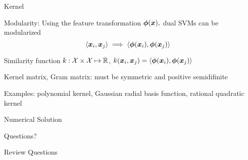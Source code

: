 \documentclass[handout,fleqn,aspectratio=169]{beamer}
\begin{document}
\begin{frame}{Kernel}

{
\bigskip

\plitemsep 0.1in
\bci

\item Modularity: Using the feature transformation $\bm{\phi}(\bm{x}),$ dual SVMs can be modularized
$$
\left\langle \bm{x}_i, \bm{x}_j \right\rangle \implies \left\langle \bm{\phi}(\bm{x}_i), \bm{\phi}(\bm{x}_j) \right\rangle
$$

\item Similarity function $k: {\cal X} \times {\cal X} \mapsto {\mathbb R}$, $k(\bm{x}_i,\bm{x}_j) = \left\langle \bm{\phi}(\bm{x}_i), \bm{\phi}(\bm{x}_j) \right\rangle$

\item Kernel matrix, Gram matrix: must be symmetric and positive semidifinite 

\item Examples: polynomial kernel, Gaussian radial basis function, rational quadratic kernel
\eci
}
{
}

\end{frame}


\begin{frame}{Numerical Solution}

\plitemsep 0.07in
\bci

\item 

\eci
\end{frame}


\begin{frame}{}
\vspace{2cm}
\LARGE Questions?


\end{frame}

\begin{frame}{Review Questions}
\bce[1)]
\item 

\ece
\end{frame}
\end{document}
